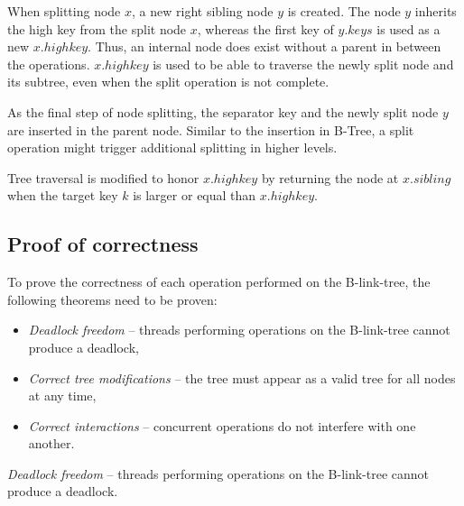 When splitting node $x$, a new right sibling node $y$ is created. The node $y$ inherits the high key from the split node $x$, whereas the first key of $y.keys$ is used as a new $x.highkey$. Thus, an internal node does exist without a parent in between the operations. $x.highkey$ is used to be able to traverse the newly split node and its subtree, even when the split operation is not complete.

As the final step of node splitting, the separator key and the newly split node $y$ are inserted in the parent node. Similar to the insertion in B-Tree, a split operation might trigger additional splitting in higher levels.

Tree traversal is modified to honor $x.highkey$ by returning the node at $x.sibling$ when the target key $k$ is larger or equal than $x.highkey$.

\subsection{Proof of correctness}

To prove the correctness of each operation performed on the B-link-tree, the following theorems need to be proven:

\begin{itemize}
  \item \textit{Deadlock freedom} -- threads performing operations on the B-link-tree cannot produce a deadlock,
  \item \textit{Correct tree modifications} -- the tree must appear as a valid tree for all nodes at any time,
  \item \textit{Correct interactions} -- concurrent operations do not interfere with one another.
\end{itemize}

\begin{theorem}
  \textit{Deadlock freedom} -- threads performing operations on the B-link-tree cannot produce a deadlock.
\end{theorem}

